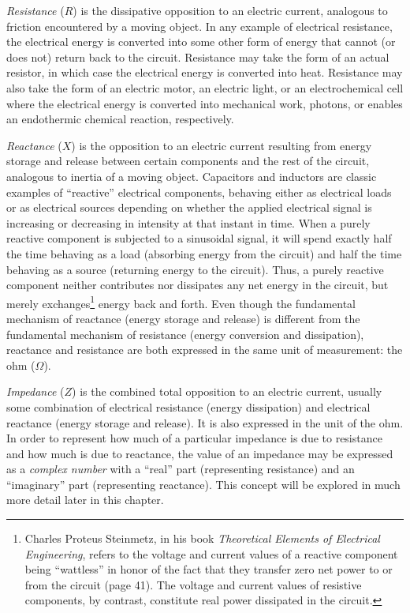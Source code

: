 \textit{Resistance} ($R$) is the dissipative opposition to an electric current, analogous to friction encountered by a moving object.  In any example of electrical resistance, the electrical energy is converted into some other form of energy that cannot (or does not) return back to the circuit.  Resistance may take the form of an actual resistor, in which case the electrical energy is converted into heat.  Resistance may also take the form of an electric motor, an electric light, or an electrochemical cell where the electrical energy is converted into mechanical work, photons, or enables an endothermic chemical reaction, respectively.    

\textit{Reactance} ($X$) is the opposition to an electric current resulting from energy storage and release between certain components and the rest of the circuit, analogous to inertia of a moving object.  Capacitors and inductors are classic examples of ``reactive'' electrical components, behaving either as electrical loads or as electrical sources depending on whether the applied electrical signal is increasing or decreasing in intensity at that instant in time.  When a purely reactive component is subjected to a sinusoidal signal, it will spend exactly half the time behaving as a load (absorbing energy from the circuit) and half the time behaving as a source (returning energy to the circuit).  Thus, a purely reactive component neither contributes nor dissipates any net energy in the circuit, but merely exchanges\footnote{Charles Proteus Steinmetz, in his book \textit{Theoretical Elements of Electrical Engineering}, refers to the voltage and current values of a reactive component being ``wattless'' in honor of the fact that they transfer zero net power to or from the circuit (page 41).  The voltage and current values of resistive components, by contrast, constitute real power dissipated in the circuit.} energy back and forth.  Even though the fundamental mechanism of reactance (energy storage and release) is different from the fundamental mechanism of resistance (energy conversion and dissipation), reactance and resistance are both expressed in the same unit of measurement: the ohm ($\Omega$).   

\textit{Impedance} ($Z$) is the combined total opposition to an electric current, usually some combination of electrical resistance (energy dissipation) and electrical reactance (energy storage and release).  It is also expressed in the unit of the ohm.  In order to represent how much of a particular impedance is due to resistance and how much is due to reactance, the value of an impedance may be expressed as a \textit{complex number} with a ``real'' part (representing resistance) and an ``imaginary'' part (representing reactance).  This concept will be explored in much more detail later in this chapter.     


